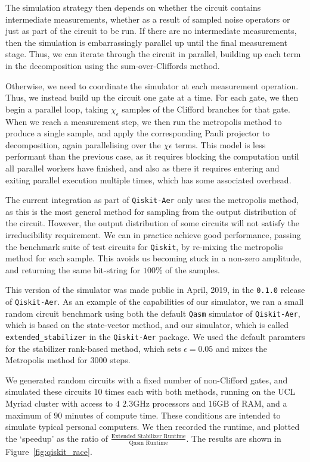 The simulation strategy then depends on whether the circuit contains intermediate measurements, whether as a result of sampled noise operators or just as part of the circuit to be run. If there are no intermediate measurements, then the simulation is embarrassingly parallel up until the final measurement stage. Thus, we can iterate through the circuit in parallel, building up each term in the decomposition using the sum-over-Cliffords method.\par
Otherwise, we need to coordinate the simulator at each measurement operation. Thus, we instead build up the circuit one gate at a time. For each gate, we then begin a parallel loop, taking $\chi_{\epsilon}$ samples of the Clifford branches for that gate. When we reach a measurement step, we then run the metropolis method to produce a single sample, and apply the corresponding Pauli projector to decomposition, again parallelising over the $\chi{\epsilon}$ terms. This model is less performant than the previous case, as it requires blocking the computation until all parallel workers have finished, and also as there it requires entering and exiting parallel execution multiple times, which has some associated overhead.\par
The current integration as part of \texttt{Qiskit-Aer} only uses the metropolis method, as this is the most general method for sampling from the output distribution of the circuit. However, the output distribution of some circuits will not satisfy the irreducibility requirement. We can in practice achieve good performance, passing the benchmark suite of test circuits for \texttt{Qiskit}, by re-mixing the metropolis method for each sample. This avoids us becoming stuck in a non-zero amplitude, and returning the same bit-string for $100\%$ of the samples.\par
This version of the simulator was made public in April, 2019, in the \texttt{0.1.0} release of \texttt{Qiskit-Aer}. As an example of the capabilities of our simulator, we ran a small random circuit benchmark using both the default \texttt{Qasm} simulator of \texttt{Qiskit-Aer}, which is based on the state-vector method, and our simulator, which is called \texttt{extended\_stabilizer} in the \texttt{Qiskit-Aer} package. We used the default paramters for the stabilizer rank-based method, which sets $\epsilon=0.05$ and mixes the Metropolis method for $3000$ steps.\par
We generated random circuits with a fixed number of non-Clifford gates, and simulated these circuits $10$ times each with both methods, running on the UCL Myriad cluster with access to $4$ $2.3\mathrm{GHz}$ processors and $16\mathrm{GB}$ of RAM, and a maximum of $90$ minutes of compute time. These conditions are intended to simulate typical personal computers. We then recorded the runtime, and plotted the `speedup' as the ratio of $\frac{\text{Extended Stabilizer Runtime}}{\text{Qasm Runtime}}$. The results are shown in Figure~\ref{fig:qiskit_race}.
